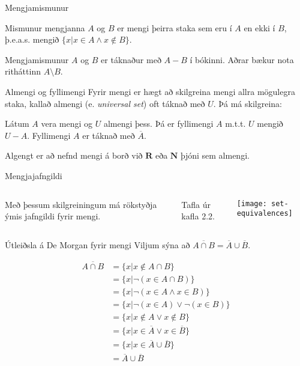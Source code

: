 \documentclass{beamer}
\begin{document}
\begin{frame}{Mengjamismunur}
\begin{tcolorbox}[title=Mengjamismunur]
Mismunur mengjanna $A$ og $B$ er mengi þeirra staka sem eru í $A$ en ekki í $B$, þ.e.a.s. mengið $\{x | x \in A \land x \notin B\}$.
\end{tcolorbox}
Mengjamismunur $A$ og $B$ er táknaður með $A - B$ í bókinni. Aðrar bækur nota ritháttinn $A \setminus B$.
\end{frame}

\begin{frame}{Almengi og fyllimengi}
Fyrir mengi er hægt að skilgreina mengi allra mögulegra staka, kallað almengi (e. \emph{universal set}) oft táknað með $U$. Þá má skilgreina:

\begin{tcolorbox}[title=Fyllimengi]
Látum $A$ vera mengi og $U$ almengi þess. Þá er fyllimengi $A$ m.t.t. $U$ mengið $U - A$. Fyllimengi $A$ er táknað með $\overline{A}$.
\end{tcolorbox}

Algengt er að nefnd mengi á borð við $\mathbf{R}$ eða $\mathbf{N}$ þjóni sem almengi.
\end{frame}

\begin{frame}{Mengjajafngildi}
\begin{columns}
Með þessum skilgreiningum má rökstyðja ýmis jafngildi fyrir mengi.

\vspace*{0.5cm}
Tafla úr kafla 2.2.
\begin{center}
\texttt{[image: set-equivalences]}
\end{center}
\end{columns}
\end{frame}

\begin{frame}{Útleiðsla á De Morgan fyrir mengi}
Viljum sýna að $\overline{A \cap B} = \overline{A} \cup \overline{B}$. \pause

\begin{align*}
\overline{A \cap B} &= \{x | x \notin A \cap B\}\\ 
&= \{x | \lnot ( x \in A \cap B)\}\\ 
&= \{x | \lnot ( x \in A \land x \in B)\}\\ 
&= \{x | \lnot ( x \in A) \lor \lnot (x \in B)\}\\ 
&= \{x | x \notin A \lor x \notin B\}\\ 
&= \{x | x \in \overline{A} \lor x \in \overline{B}\}\\ 
&= \{x | x \in \overline{A} \cup \overline{B}\}\\ 
&= \overline{A} \cup \overline{B}
\end{align*}
\end{frame}
\end{document}
